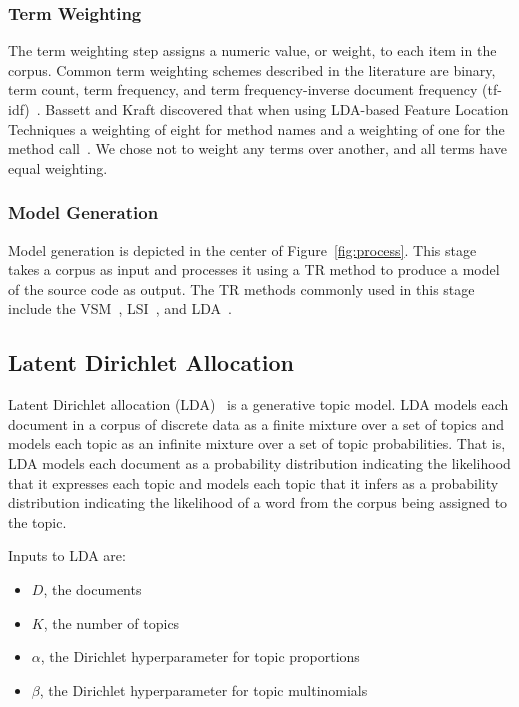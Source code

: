     \subsubsection{Term Weighting}
    The term weighting step assigns a numeric value, or weight, to each item in the corpus.
    Common term weighting schemes described in the literature are
    binary, term count, term frequency, and
    term frequency-inverse document frequency (tf-idf)~\cite{Salton:1988}.
    Bassett and Kraft discovered that when using LDA-based Feature Location Techniques a weighting of eight for method names and a weighting of one for the method call~\cite{Bassett-Kraft:2013}.
    We chose not to weight any terms over another, and all terms have
    equal weighting.

    \subsubsection{Model Generation}
    Model generation is depicted in the center of Figure~\ref{fig:process}.
    This stage takes a corpus as input and processes it using a TR method
    to produce a model of the source code as output.
    The TR methods commonly used in this stage include the VSM~\cite{Salton:1971},
    LSI~\cite{Deerwester-etal:1990},
    and LDA~\cite{Blei-etal:2003}.


\subsection{Latent Dirichlet Allocation}

Latent Dirichlet allocation (LDA)~\cite{Blei-etal:2003} is a generative topic model.
LDA models each document in a corpus of discrete data as a finite mixture over a set of topics
and models each topic as an infinite mixture over a set of topic probabilities.
That is, LDA models each document as a probability distribution
indicating the likelihood that it expresses each topic and
models each topic that it infers as a probability distribution
indicating the likelihood of a word from the corpus being assigned to the topic.

Inputs to LDA are:
\begin{itemize}
\setlength{\itemsep}{1pt}
\item $D$, the documents
\item $K$, the number of topics
\item $\alpha$, the Dirichlet hyperparameter for topic proportions
\item $\beta$, the Dirichlet hyperparameter for topic multinomials
\end{itemize}

